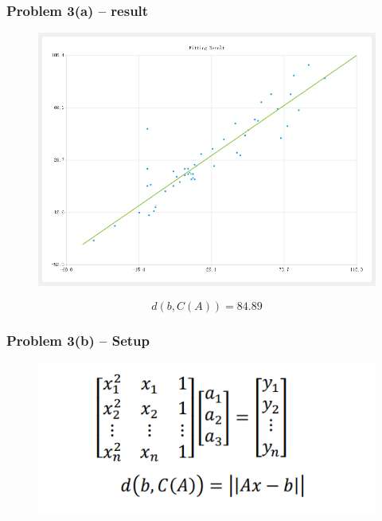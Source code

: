 \begin{frame}         %
    \frametitle{Problem 3(a) – result}

    \begin{figure}
        \centering
        \includegraphics[height = 0.5\textheight]{img/result3_1.png}
    \end{figure}
        \begin{equation}
        d(b,C(A))=84.89
    \end{equation}
\end{frame}
\begin{frame}
        \frametitle{Problem 3(b) – Setup}

    \begin{figure}
        \centering
        \includegraphics[height = 0.5\textheight]{img/setup3_2.png}
    \end{figure}

    \end{frame}
